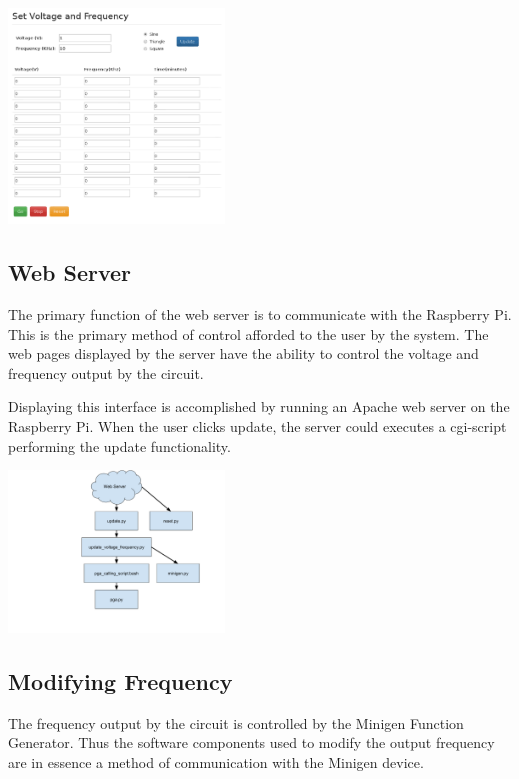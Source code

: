 \documentclass{article}	%
\begin{document}
\begin{multicols}{2}
\begin{center}
\includegraphics[width=0.43\textwidth,keepaspectratio]{web_interface.pdf}
\end{center}

\subsection{Web Server}
The primary function of the web server is to communicate with the Raspberry Pi.
This is the primary method of control afforded 
to the user by the system. 
The web pages displayed by the server
have the ability to control the voltage and frequency output by the circuit.

Displaying this interface is accomplished by 
running an Apache web server on the Raspberry Pi. 
When the user clicks update, the server could executes 
a cgi-script performing the update functionality.

\begin{center}
\includegraphics[width=0.43\textwidth,keepaspectratio]{script_layout.pdf}
\end{center}

\subsection{Modifying Frequency}
The frequency output by the circuit is controlled 
by the Minigen Function Generator.
Thus the software components used to 
modify the output frequency
are in essence
a method of communication with the Minigen device.


\end{multicols}
\end{document}
